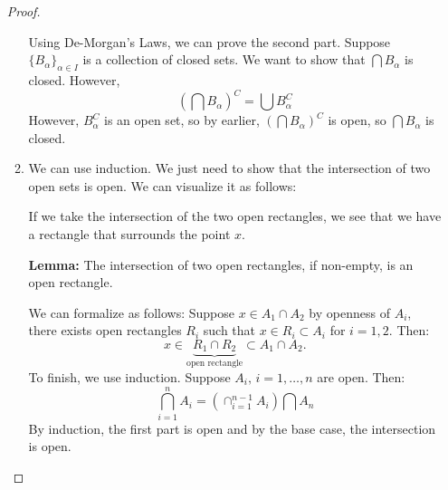 \begin{itemize}
\begin{proof}
\begin{enumerate}
                        Using De-Morgan's Laws, we can prove the second part. Suppose $\{B_\alpha\}_{\alpha\in I}$ is a collection of closed sets. We want to show that $\bigcap B_\alpha$ is closed. However,
                        \begin{equation}
                            \left(\bigcap B_\alpha\right)^C = \bigcup B_\alpha^C
                        \end{equation}
                        However, $B_\alpha^C$ is an open set, so by earlier, $\left(\bigcap B_\alpha\right)^C$ is open, so $\bigcap B_\alpha$ is closed.
                        \item We can use induction. We just need to show that the intersection of two open sets is open. We can visualize it as follows: 
                        \begin{center}
                        \end{center}
                        If we take the intersection of the two open rectangles, we see that we have a rectangle that surrounds the point $x$.
                        \vspace{2mm}

                        \textbf{Lemma:} The intersection of two open rectangles, if non-empty, is an open rectangle.
                        \vspace{2mm}

                        We can formalize as follows: Suppose $x\in A_1 \cap A_2$ by openness of $A_i$, there exists open rectangles $R_i$ such that $x\in R_i \subset A_i$ for $i=1,2.$ Then: 
                        \begin{equation}
                            x\in \underbrace{R_1 \cap R_2}_{\text{open rectangle}} \subset A_1 \cap A_2.
                        \end{equation}
                        To finish, we use induction. Suppose $A_i,\, i=1,\dots, n$ are open. Then: 
                        \begin{equation}
                            \bigcap_{i=1}^{n}A_i = \left(\cap_{i=1}^{n-1}A_i\right)\bigcap A_n
                        \end{equation}
                        By induction, the first part is open and by the base case, the intersection is open.
                        \vspace{2mm}


\end{enumerate}
\end{proof}
\end{itemize}
